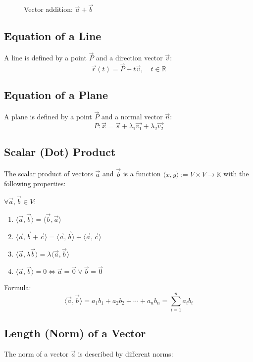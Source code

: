 \begin{figure}[h!]
	\centering
	\caption{Vector addition: $\vec{a} + \vec{b}$}
\end{figure}

\subsection{Equation of a Line}
A line is defined by a point $\vec{P}$ and a direction vector $\vec{v}$:
\[
	\vec{r}(t) = \vec{P} + t\vec{v}, \quad t \in \mathbb{R}
\]

\subsection{Equation of a Plane}
A plane is defined by a point $\vec{P}$ and a normal vector $\vec{n}$:
\[
	P: \vec{x} = \vec{s} + \lambda_1 \vec{v_1} + \lambda_2 \vec{v_2}
\]
\subsection{Scalar (Dot) Product}
The scalar product of vectors $\vec{a}$ and $\vec{b}$ is a function $\langle x, y\rangle :=V \times V \rightarrow \mathbb{K}$
with the following properties:

$\forall \vec{a}, \vec{b} \in V$:
\begin{enumerate}[label=(\roman*)]
	\item $\langle\vec{a}, \vec{b}\rangle = \langle\vec{b}, \vec{a}\rangle $
	\item $\langle\vec{a}, \vec{b} + \vec{c}\rangle = \langle\vec{a}, \vec{b}\rangle + \langle\vec{a}, \vec{c}\rangle$
	\item $\langle\vec{a}, \lambda \vec{b}\rangle = \lambda \langle\vec{a}, \vec{b}\rangle$
	\item $\langle\vec{a}, \vec{b}\rangle = 0 \Leftrightarrow \vec{a} = \vec{0} \vee \vec{b} = \vec{0}$
\end{enumerate}

\noindent Formula:
\[
	\langle\vec{a}, \vec{b}\rangle = a_1 b_1 + a_2 b_2 + \cdots + a_n b_n = \sum_{i = 1}^{n} a_i b_i
\]


\subsection{Length (Norm) of a Vector}
The norm of a vector $\vec{a}$ is described by different norms:

